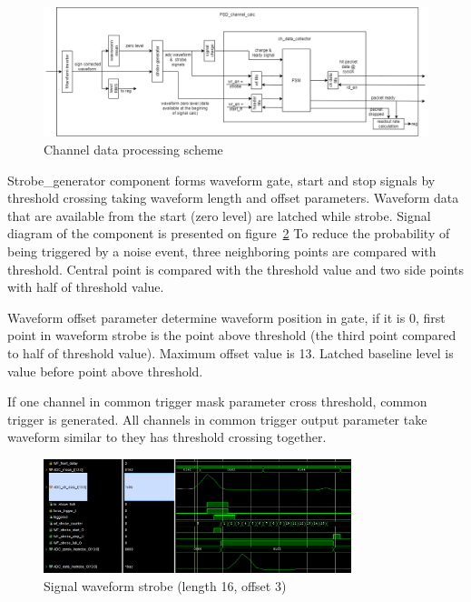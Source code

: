 \documentclass{article}
\begin{document}
\begin{figure}[H]
	\centering 
	\includegraphics[width=1.0\textwidth]{ADC_event_collection.png}
	\caption{\label{fig:2} Channel data processing scheme}
\end{figure}


Strobe\_generator component forms waveform gate, start and stop signals by threshold crossing taking waveform length and offset parameters. Waveform data that are available from the start (zero level) are latched while strobe. Signal diagram of the component is presented on figure~\ref{fig:3} To reduce the probability of being triggered by a noise event, three neighboring points are compared with threshold. Central point is compared with the threshold value and two side points with half of threshold value.

Waveform offset parameter determine waveform position in gate, if it is 0, first point in waveform strobe is  the point above threshold (the third point compared to half of threshold value). Maximum offset value is 13. Latched baseline level is value before point above threshold.

If one channel in common trigger mask parameter cross threshold, common trigger is generated. All channels in common trigger output parameter take waveform similar to they has threshold crossing together.

\begin{figure}[H]
	\centering 
	\includegraphics[width=0.8\textwidth]{wf_strobe_diag_sim.png}
	\caption{\label{fig:3} Signal waveform strobe (length 16, offset 3)}
\end{figure}
\end{document}
